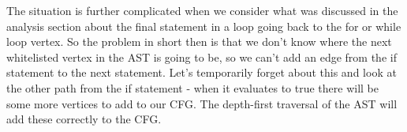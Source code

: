 The situation is further complicated when we consider what was discussed in the analysis section about the final statement in a loop going back to the for or while loop vertex. So the problem in short then is that we don't know where the next whitelisted vertex in the AST is going to be, so we can't add an edge from the if statement to the next statement. Let's temporarily forget about this and look at the other path from the if statement - when it evaluates to true there will be some more vertices to add to our CFG. The depth-first traversal of the AST will add these correctly to the CFG. 
